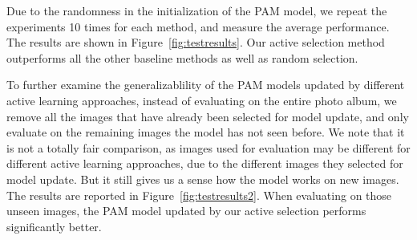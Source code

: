 Due to the randomness in the initialization of the PAM model, we repeat the experiments 10 times for each method, and measure the average performance. The results are shown in Figure~\ref{fig:testresults}. Our active selection method outperforms all the other baseline methods as well as random selection.

To further examine the generalizablility of the PAM models updated by different active learning approaches, instead of evaluating on the entire photo album, we remove all the images that have already been selected for model update, and only evaluate on the remaining images the model has not seen before.  We note that it is not a totally fair comparison, as images used for evaluation may be different for different active learning approaches, due to the different images they selected for model update. But it still gives us a sense how the model works on new images. The results are reported in Figure~\ref{fig:testresults2}. When evaluating on those unseen images, the PAM model updated by our active selection performs significantly better.

